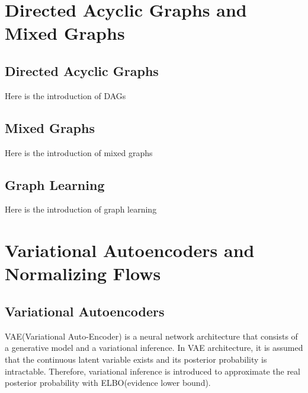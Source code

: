 \documentclass[10pt]{article}
\begin{document}
\section{Directed Acyclic Graphs and Mixed Graphs}
\subsection{Directed Acyclic Graphs}

Here is the introduction of DAGs

\subsection{Mixed Graphs}

Here is the introduction of mixed graphs

\subsection{Graph Learning}

Here is the introduction of graph learning

\section{Variational Autoencoders and Normalizing Flows}

\subsection{Variational Autoencoders}

VAE(Variational Auto-Encoder)\cite{kingma2013auto} is a neural network architecture that consists of a generative model and a variational inference. In VAE architecture, it is assumed that the continuous latent variable exists and its posterior probability is intractable. Therefore, variational inference is introduced to approximate the real posterior probability with ELBO(evidence lower bound).\\
\end{document}
